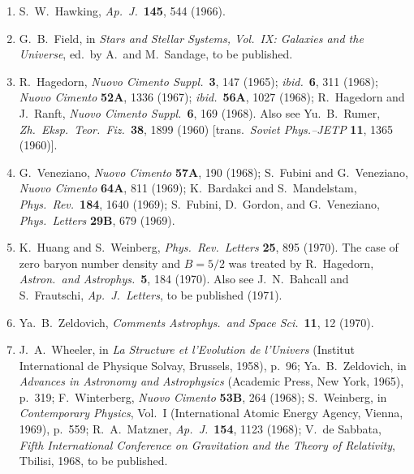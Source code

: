 \begin{enumerate}
  \item{}\label{ch15-ref-156}
  S.~W.~Hawking, \emph{Ap.\ J.}\ \textbf{145}, 544 (1966).

  \item{}\label{ch15-ref-157}
  G.~B.~Field, in
  \emph{Stars and Stellar Systems, Vol.\ IX: Galaxies and the Universe},
  ed.\ by A.\ and M.~Sandage, to be published.

  \item{}\label{ch15-ref-158}
  R.~Hagedorn, \emph{Nuovo Cimento Suppl.}\ \textbf{3}, 147 (1965);
  \emph{ibid.}\ \textbf{6}, 311 (1968);
  \emph{Nuovo Cimento} \textbf{52A}, 1336 (1967);
  \emph{ibid.}\ \textbf{56A}, 1027 (1968);
  R.~Hagedorn and J.~Ranft,
  \emph{Nuovo Cimento Suppl.}\ \textbf{6}, 169 (1968).
  Also see Yu.~B.~Rumer,
  \emph{Zh.\ Eksp.\ Teor.\ Fiz.}\ \textbf{38}, 1899 (1960)
  [trans.\ \emph{Soviet Phys.--JETP} \textbf{11}, 1365 (1960)].

  \item{}\label{ch15-ref-159}
  G.~Veneziano, \emph{Nuovo Cimento} \textbf{57A}, 190 (1968);
  S.~Fubini and G.~Veneziano,
  \emph{Nuovo Cimento} \textbf{64A}, 811 (1969);
  K.~Bardakci and S.~Mandelstam,
  \emph{Phys.\ Rev.}\ \textbf{184}, 1640 (1969);
  S.~Fubini, D.~Gordon, and G.~Veneziano,
  \emph{Phys.\ Letters} \textbf{29B}, 679 (1969).

  \item{}\label{ch15-ref-160}
  K.~Huang and S.~Weinberg,
  \emph{Phys.\ Rev.\ Letters} \textbf{25}, 895 (1970).
  The case of zero baryon number density and \(B=5/2\) was treated by
  R.~Hagedorn, \emph{Astron.\ and Astrophys.}\ \textbf{5}, 184 (1970).
  Also see J.~N.~Bahcall and S.~Frautschi,
  \emph{Ap.\ J.\ Letters}, to be published (1971).

  \item{}\label{ch15-ref-161}
  Ya.~B.~Zeldovich, \emph{Comments Astrophys.\ and Space Sci.}\
  \textbf{11}, 12 (1970).

  \item{}\label{ch15-ref-162}
  J.~A.~Wheeler, in \emph{La Structure et l'Evolution de l'Univers}
  (Institut International de Physique Solvay, Brussels, 1958), p.~96;
  Ya.~B.~Zeldovich, in \emph{Advances in Astronomy and Astrophysics}
  (Academic Press, New York, 1965), p.~319;
  F.~Winterberg, \emph{Nuovo Cimento} \textbf{53B}, 264 (1968);
  S.~Weinberg, in \emph{Contemporary Physics}, Vol.~I
  (International Atomic Energy Agency, Vienna, 1969), p.~559;
  R.~A.~Matzner, \emph{Ap.\ J.}\ \textbf{154}, 1123 (1968);
  V.~de Sabbata,
  \emph{Fifth International Conference on Gravitation and the Theory of
  Relativity}, Tbilisi, 1968, to be published.


\end{enumerate}
